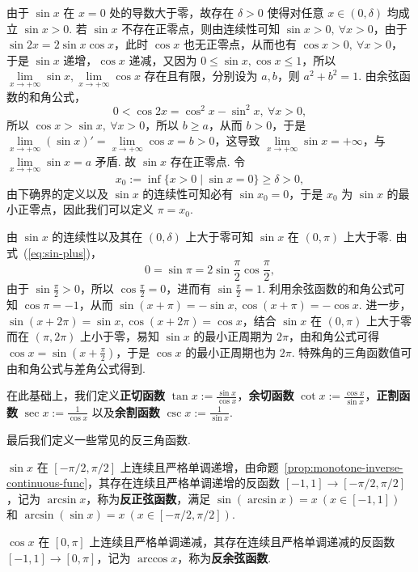 \documentclass[../main.tex]{subfiles}
\begin{document}
由于 $\sin x$ 在 $x = 0$ 处的导数大于零，故存在 $\delta > 0$ 使得对任意 $x \in (0, \delta)$ 均成立 $\sin x > 0$. 若 $\sin x$ 不存在正零点，则由连续性可知 $\sin x > 0,\ \forall x > 0$，由于 $\sin 2x = 2\sin x \cos x$，此时 $\cos x$ 也无正零点，从而也有 $\cos x > 0,\ \forall x > 0$，于是 $\sin x$ 递增，$\cos x$ 递减，又因为 $0 \leqslant \sin x, \cos x \leqslant 1$，所以 $\lim\limits_{x \to +\infty} \sin x, \lim\limits_{x \to +\infty} \cos x$ 存在且有限，分别设为 $a, b$，则 $a^2 + b^2 = 1$. 由余弦函数的和角公式， 
$$
0 < \cos 2x = \cos^2 x - \sin^2 x,\ \forall x > 0, 
$$
所以 $\cos x > \sin x,\ \forall x > 0$，所以 $b \geqslant a$，从而 $b > 0$，于是 $\lim\limits_{x \to +\infty} (\sin x)' = \lim\limits_{x \to +\infty} \cos x = b > 0$，这导致 $\lim\limits_{x \to +\infty} \sin x = +\infty$，与 $\lim\limits_{x \to +\infty} \sin x = a$ 矛盾. 故 $\sin x$ 存在正零点. 令 
$$
x_0 := \inf \{x > 0 \mid \sin x = 0\} \geqslant \delta > 0, 
$$
由下确界的定义以及 $\sin x$ 的连续性可知必有 $\sin x_0 = 0$，于是 $x_0$ 为 $\sin x$ 的最小正零点，因此我们可以定义 $\pi = x_0$. 

由 $\sin x$ 的连续性以及其在 $(0, \delta)$ 上大于零可知 $\sin x$ 在 $(0, \pi)$ 上大于零. 由式~(\ref{eq:sin-plus})，
$$
0 = \sin \pi = 2\sin \frac{\pi}{2} \cos \frac{\pi}{2}, 
$$
由于 $\sin \frac{\pi}{2} > 0$，所以 $\cos \frac{\pi}{2} = 0$，进而有 $\sin \frac{\pi}{2} = 1$. 利用余弦函数的和角公式可知 $\cos \pi = -1$，从而 $\sin (x + \pi) = -\sin x, \cos (x + \pi) = -\cos x$. 进一步，$\sin (x + 2\pi) = \sin x, \cos (x + 2\pi) = \cos x$，结合 $\sin x$ 在 $(0, \pi)$ 上大于零而在 $(\pi, 2\pi)$ 上小于零，易知 $\sin x$ 的最小正周期为 $2\pi$，由和角公式可得 $\cos x = \sin (x + \frac{\pi}{2})$，于是 $\cos x$ 的最小正周期也为 $2\pi$. 特殊角的三角函数值可由和角公式与差角公式得到. 

在此基础上，我们定义\textbf{正切函数} $\tan x := \frac{\sin x}{\cos x}$，\textbf{余切函数} $\cot x := \frac{\cos x}{\sin x}$，\textbf{正割函数} $\sec x := \frac{1}{\cos x}$ 以及\textbf{余割函数} $\csc x := \frac{1}{\sin x}$. 

最后我们定义一些常见的反三角函数. 

$\sin x$ 在 $[-\pi/2, \pi/2]$ 上连续且严格单调递增，由命题~\ref{prop:monotone-inverse-continuous-func}，其存在连续且严格单调递增的反函数 $[-1, 1] \to [-\pi/2, \pi/2]$，记为 $\arcsin x$，称为\textbf{反正弦函数}，满足 $\sin(\arcsin x) = x\ (x \in [-1, 1])$ 和 $\arcsin(\sin x) = x\ (x \in [-\pi/2, \pi/2])$. 

$\cos x$ 在 $[0, \pi]$ 上连续且严格单调递减，其存在连续且严格单调递减的反函数 $[-1, 1] \to [0, \pi]$，记为 $\arccos x$，称为\textbf{反余弦函数}. 
\end{document}
